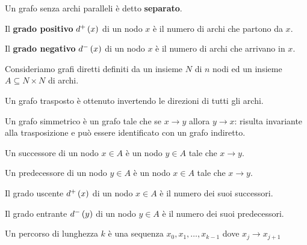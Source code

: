 \documentclass[\main/main.tex]{subfiles}
\begin{document}
\begin{multicols}{2}
\begin{definition}
        Un grafo senza archi paralleli è detto \textbf{separato}.
    \end{definition}
    \begin{definition}
        Il \textbf{grado positivo} \(d^+\left(x\right)\) di un nodo \(x\) è il numero di archi che partono da \(x\).
    \end{definition}
    \begin{definition}
        Il \textbf{grado negativo} \(d^-\left(x\right)\) di un nodo \(x\) è il numero di archi che arrivano in \(x\).
    \end{definition}
\begin{observation}
    Consideriamo grafi diretti definiti da un insieme \(N\) di \(n\) nodi ed un insieme \(A \subseteq N \times N\) di archi.
\end{observation}
\begin{definition}
    Un grafo trasposto è ottenuto invertendo le direzioni di tutti gli archi.
\end{definition}
\begin{definition}
    Un grafo simmetrico è un grafo tale che se \(x \rightarrow y\) allora \(y \rightarrow x\): risulta invariante alla trasposizione e può essere identificato con un grafo indiretto.
\end{definition}
\begin{definition}[Successore]
    Un successore di un nodo \(x \in A\) è un nodo \(y \in A\) tale che \(x \rightarrow y\).
\end{definition}
\begin{definition}[Predecessore]
    Un predecessore di un nodo \(y \in A\) è un nodo \(x \in A\) tale che \(x \rightarrow y\).
\end{definition}
\begin{definition}
    Il grado uscente \(d^+\left(x\right)\) di un nodo \(x \in A\) è il numero dei suoi successori.
\end{definition}
\begin{definition}
    Il grado entrante \(d^-\left(y\right)\) di un nodo \(y \in A\) è il numero dei suoi predecessori.
\end{definition}
\begin{definition}
    Un percorso di lunghezza \(k\) è una sequenza \(x_0, x_1, \ldots, x_{k-1}\) dove \(x_j \rightarrow x_{j+1}\)
\end{definition}

\end{multicols}
\end{document}
